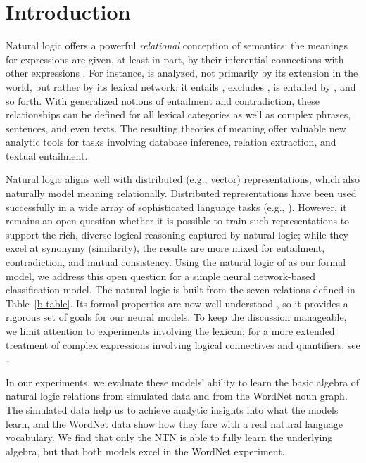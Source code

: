 \section{Introduction}\label{sec:intro}

Natural logic offers a powerful \emph{relational} conception of
semantics: the meanings for expressions are given, at least in part,
by their inferential connections with other expressions
\cite{vanBenthem08NATLOG,maccartney2009extended}. For instance,
 is analyzed, not primarily by its extension in the
world, but rather by its lexical network: it entails ,
excludes , is entailed by , and so forth. With generalized notions of entailment and
contradiction, these relationships can be defined for all lexical
categories as well as complex phrases, sentences, and even texts. The
resulting theories of meaning offer valuable new analytic tools for
tasks involving database inference, relation extraction, and textual
entailment.

Natural logic aligns well with distributed (e.g., vector)
representations, which also naturally model meaning relationally.
Distributed representations have been used successfully in a wide
array of sophisticated language tasks (e.g., \cite{collobert2011natural}). %
However, it remains an open question whether it is possible to train
such representations to support the rich, diverse logical reasoning
captured by natural logic; while they excel at
synonymy (similarity), the results are more mixed for entailment,
contradiction, and mutual consistency.  Using the natural logic of
\cite{maccartney2009extended} as our formal model, we address this
open question for a simple neural network-based classification model. 
The natural logic is built from the seven relations defined in
Table~\ref{b-table}. Its formal properties are now well-understood
\cite{Icard:Moss:2013:LILT}, so it provides a rigorous
set of goals for our neural models. To keep the discussion manageable,
we limit attention to experiments involving the lexicon; for a more
extended treatment of complex expressions involving logical
connectives and quantifiers, see \citet{Bowman:Potts:Manning:2014}.

In our experiments, we evaluate these models' ability to learn the
basic algebra of natural logic relations from simulated data and from
the WordNet noun graph. The simulated data help us to achieve analytic
insights into what the models learn, and the WordNet data show how they
fare with a real natural language vocabulary.  We find that only the NTN is able to fully
learn the underlying algebra, but that both models excel in the 
WordNet experiment.

